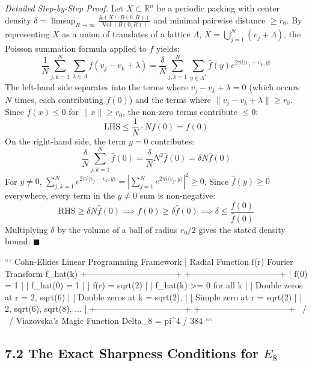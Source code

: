 \documentclass[11pt,twoside,openright]{amsbook}
\begin{document}
\textit{Detailed Step-by-Step Proof.} Let $X \subset \mathbb{R}^n$ be a periodic packing with center density $\delta = \limsup_{R \to \infty} \frac{\#(X \cap B(0, R))}{\operatorname{Vol}(B(0, R))}$ and minimal pairwise distance $\ge r_0$. By representing $X$ as a union of translates of a lattice $\Lambda$, $X = \bigcup_{j=1}^N (v_j + \Lambda)$, the Poisson summation formula applied to $f$ yields:
$$\frac{1}{N} \sum_{j, k=1}^N \sum_{\lambda \in \Lambda} f(v_j - v_k + \lambda) = \frac{\delta}{N} \sum_{j, k=1}^N \sum_{y \in \Lambda^*} \widehat{f}(y) e^{2\pi i \langle v_j - v_k, y \rangle}$$
The left-hand side separates into the terms where $v_j - v_k + \lambda = 0$ (which occurs $N$ times, each contributing $f(0)$) and the terms where $\|v_j - v_k + \lambda\| \ge r_0$. Since $f(x) \le 0$ for $\|x\| \ge r_0$, the non-zero terms contribute $\le 0$:
$$\text{LHS} \le \frac{1}{N} \cdot N f(0) = f(0)$$
On the right-hand side, the term $y = 0$ contributes:
$$\frac{\delta}{N} \sum_{j, k=1}^N \widehat{f}(0) = \frac{\delta}{N} N^2 \widehat{f}(0) = \delta N \widehat{f}(0)$$
For $y \ne 0$, $\sum_{j, k=1}^N e^{2\pi i \langle v_j - v_k, y \rangle} = \left| \sum_{j=1}^N e^{2\pi i \langle v_j, y \rangle} \right|^2 \ge 0$.
Since $\widehat{f}(y) \ge 0$ everywhere, every term in the $y \ne 0$ sum is non-negative:
$$\text{RHS} \ge \delta N \widehat{f}(0) \implies f(0) \ge \delta \widehat{f}(0) \implies \delta \le \frac{f(0)}{\widehat{f}(0)}$$
Multiplying $\delta$ by the volume of a ball of radius $r_0/2$ gives the stated density bound. $\blacksquare$

```
                   Cohn-Elkies Linear Programming Framework
                                       |
    Radial Function f(r)                             Fourier Transform f_hat(k)
    +--------------------------------+               +--------------------------------+
    | f(0) = 1                       |               | f_hat(0) = 1                   |
    | f(r) = sqrt(2)     |               | f_hat(k) >= 0 for all k        |
    | Double zeros at r = 2, sqrt(6) |               | Double zeros at k = sqrt(2),   |
    | Simple zero at r = sqrt(2)     |               |   2, sqrt(6), sqrt(8), ...     |
    +--------------------------------+               +--------------------------------+
                                       \           /
                                        \         /
                               Viazovska's Magic Function
                                     Delta_8 = pi^4 / 384
```

\subsection{7.2 The Exact Sharpness Conditions for $E_8$}
\end{document}
